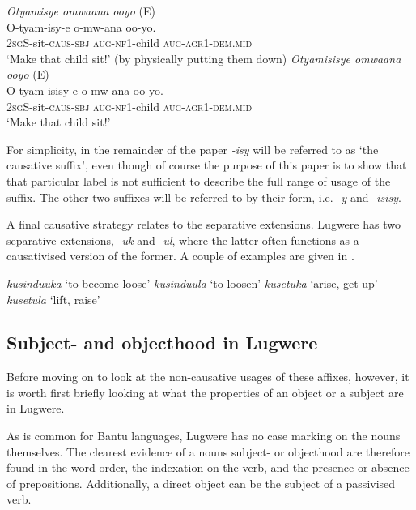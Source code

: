 \documentclass[output=paper,colorlinks,citecolor=brown,draftmode]{langscibook}
\begin{document}
\ea
\begin{xlist}   \label{ex-direct}
 \ex \label{ex-directA} \emph{Otyamisye omwaana ooyo} (E)\\
  \gll  O-tyam-isy-e 		o-mw-ana 	oo-yo. \\ 
\textsc{2sg}S-sit-\textsc{caus}-\textsc{sbj} \textsc{aug-nf1}-child \textsc{aug-agr1-dem.mid} \\
    \glt  `Make that child sit!' (by physically putting them down)
    \newpage
    \ex \label{ex-directB} \emph{Otyamisisye omwaana ooyo} (E) \\
     \gll  O-tyam-isisy-e 		o-mw-ana 	oo-yo. \\ 
\textsc{2sg}S-sit-\textsc{caus}-\textsc{sbj} \textsc{aug-nf1}-child \textsc{aug-agr1-dem.mid} \\
    \glt  `Make that child sit!' 
      \end{xlist}     
      \z

 For simplicity, in the remainder of the paper \emph{-isy} will be referred to as `the causative suffix', even though of course the purpose of this paper is to show that that particular label is not sufficient to describe the full range of usage of the suffix. The other two suffixes will be referred to by their form, i.e. \emph{-y} and \emph{-isisy}.

A final causative strategy relates to the separative extensions. Lugwere has two separative extensions, \emph{-uk} and \emph{-ul}, where the latter often functions as a causativised version of the former. A couple of examples are given in . 

\ea
\begin{xlist}   \label{ex:Saebo:separative}
        \ex \emph{kusinduuka} ‘to become loose'
         \ex \emph{kusinduula} ‘to loosen'
         \ex \emph{kusetuka} ‘arise, get up'
         \ex \emph{kusetula} ‘lift, raise'
\end{xlist}     
\z

\subsection{Subject- and objecthood in Lugwere}

Before moving on to look at the non-causative usages of these affixes, however, it is worth first briefly looking at what the properties of an object or a subject are in Lugwere. 

As is common for Bantu languages, Lugwere has no case marking on the nouns themselves. The clearest evidence of a nouns subject- or objecthood are therefore found in the word order, the indexation on the verb, and the presence or absence of prepositions. Additionally, a direct object can be the subject of a passivised verb. 
\end{document}
